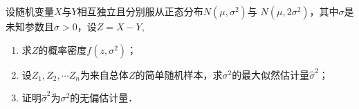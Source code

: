 \documentclass[plain,noanswer,medmath]{../../template/jnuexam}
\begin{document}
\begin{problem}[points=11]
设随机变量$X$与$Y$相互独立且分别服从正态分布$N\left(\mu ,\sigma^2 \right)$与
$N\left(\mu ,2\sigma^2 \right)$，其中$\sigma$是未知参数且$\sigma > 0$，设$Z = X - Y$,
\begin{enumerate}
\item 求$Z$的概率密度$f\left(z, \sigma^2 \right)$；
\item 设$Z_1,Z_2, \cdots Z_n$为来自总体$Z$的简单随机样本，求$\sigma^2$的最大似然估计量$\hat{\sigma}^2$；
\item 证明$\hat{\sigma}^2$为$\sigma^2$的无偏估计量．
\end{enumerate}
\end{problem}
\end{document}
